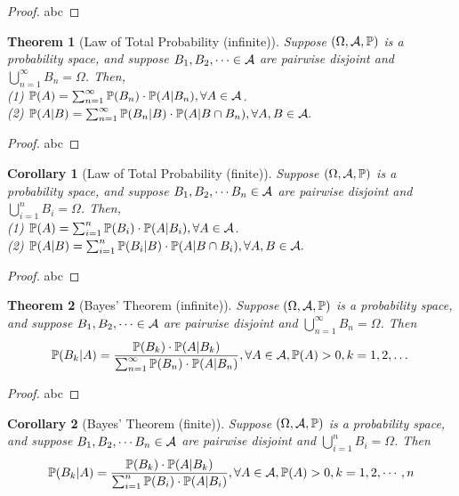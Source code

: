 \documentclass[openany,12pt]{book}
\newtheorem{theorem}{Theorem}[chapter]
\newtheorem{corollary}{Corollary}[chapter]
\begin{document}
\begin{proof}
  abc
\end{proof}

\begin{theorem}[Law of Total Probability (infinite)]
  Suppose $(\Omega,\mathcal{A},\mathbb{P})$ is a probability space, and suppose $B_1,B_2,\cdots\in\mathcal{A}$ are pairwise disjoint and $\bigcup_{n=1}^\infty B_n=\Omega$. Then,\\
  (1) $\mathbb{P}(A)=\sum_{n=1}^{\infty} \mathbb{P}(B_n)\cdot \mathbb{P}(A|B_n),\forall A\in\mathcal{A}$.\\
  (2) $\mathbb{P}(A|B)=\sum_{n=1}^{\infty} \mathbb{P}(B_n |B)\cdot \mathbb{P}(A|B\cap B_n),\forall A,B\in\mathcal{A}.$
\end{theorem}

\begin{proof}
  abc
\end{proof}

\begin{corollary}[Law of Total Probability (finite)]
  Suppose $(\Omega,\mathcal{A},\mathbb{P})$ is a probability space, and suppose $B_1,B_2,\cdots B_n\in\mathcal{A}$ are pairwise disjoint and $\bigcup_{i=1}^n B_i=\Omega$. Then,\\
  (1) $\mathbb{P}(A)=\sum_{i=1}^{n} \mathbb{P}(B_i)\cdot \mathbb{P}(A|B_i),\forall A\in\mathcal{A}$.\\
  (2) $\mathbb{P}(A|B)=\sum_{i=1}^{n} \mathbb{P}(B_i |B)\cdot \mathbb{P}(A|B\cap B_i),\forall A,B\in\mathcal{A}.$
\end{corollary}

\begin{proof}
  abc
\end{proof}

\begin{theorem}[Bayes' Theorem (infinite)]
  Suppose $(\Omega,\mathcal{A},\mathbb{P})$ is a probability space, and suppose $B_1,B_2,\cdots\in\mathcal{A}$ are pairwise disjoint and $\bigcup_{n=1}^\infty B_n=\Omega$.  Then $$\mathbb{P}(B_k|A)=\frac{\mathbb{P}(B_k)\cdot \mathbb{P}(A|B_k)}{\sum_{n=1}^{\infty} \mathbb{P}(B_n)\cdot \mathbb{P}(A|B_n)},\forall A\in\mathcal{A}, \mathbb{P}(A)>0,k=1,2,\dots$$
\end{theorem}

\begin{proof}
  abc
\end{proof}

\begin{corollary}[Bayes' Theorem (finite)]
  Suppose $(\Omega,\mathcal{A},\mathbb{P})$ is a probability space, and suppose $B_1,B_2,\cdots B_n\in\mathcal{A}$ are pairwise disjoint and $\bigcup_{i=1}^n B_i=\Omega$.  Then $$\mathbb{P}(B_k|A)=\frac{\mathbb{P}(B_k)\cdot \mathbb{P}(A|B_k)}{\sum_{i=1}^{n} \mathbb{P}(B_i)\cdot \mathbb{P}(A|B_i)},\forall A\in\mathcal{A}, \mathbb{P}(A)>0,k=1,2, \cdots,n$$
\end{corollary}
\end{document}
